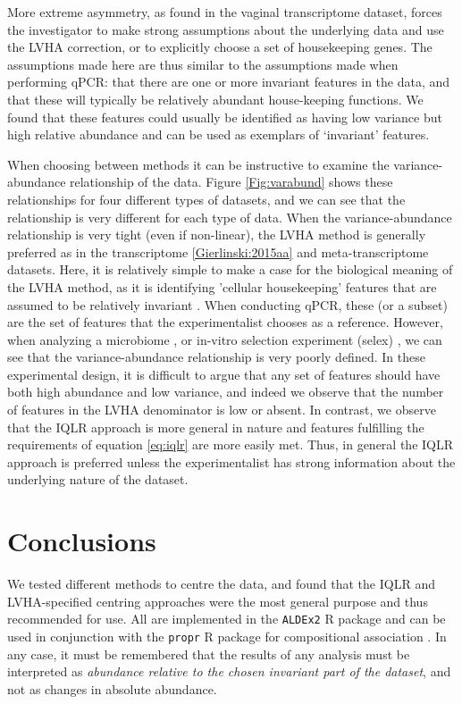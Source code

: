 \documentclass[graybox]{svmult}
\begin{document}
More extreme asymmetry, as found in the vaginal transcriptome dataset, forces the investigator to make strong assumptions about the underlying data and use the LVHA correction, or to explicitly choose a set of housekeeping genes. The assumptions made here are thus similar to the assumptions made when performing qPCR: that there are one or more invariant features in the data, and that these will typically be relatively abundant house-keeping functions. We found that these features could usually be identified as having low variance but high relative abundance and can be used as exemplars of `invariant' features. 

When choosing between methods it can be instructive to examine the variance-abundance relationship of the data. Figure \ref{Fig:varabund} shows these relationships for four different types of datasets, and we can see that the relationship is very different for each type of data. When the variance-abundance relationship is very tight (even if non-linear), the LVHA method is generally preferred as in the transcriptome \ref{Gierlinski:2015aa} and meta-transcriptome datasets. Here, it is relatively simple to make a case for the biological meaning of the LVHA method, as it is identifying 'cellular housekeeping' features that are assumed to be relatively invariant \cite{Scott:2010}. When conducting qPCR, these (or a subset) are the set of features that the experimentalist chooses as a reference. However, when analyzing a microbiome \cite{bian:2017}, or in-vitro selection experiment (selex) \cite{mcmurrough:2014}, we can see that the variance-abundance relationship is very poorly defined. In these experimental design, it is difficult to argue that any set of features should have both high abundance and low variance, and indeed we observe that the number of features in the LVHA denominator is low or absent. In contrast, we observe that the IQLR approach is more general in nature and features fulfilling the requirements of equation \ref{eq:iqlr} are more easily met. Thus, in general the IQLR approach is preferred unless the experimentalist has strong information about the underlying nature of the dataset. 

 
\section*{Conclusions}
We tested  different methods to  centre the data, and found that the IQLR and LVHA-specified centring approaches were the most general purpose and thus recommended for use. All are implemented in the \texttt{ALDEx2} R package \cite{fernandes:2014} and can be used in conjunction with the \texttt{propr} R package for compositional association \cite{Quinn:2017}.   In any case, it must be remembered that the results of any analysis must be interpreted as \textit{abundance relative to the chosen invariant part of the dataset}, and not as changes in absolute abundance.
\end{document}
